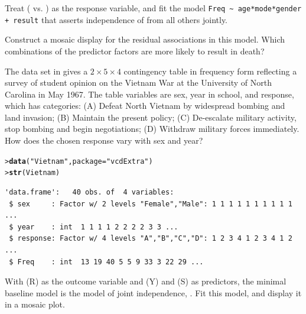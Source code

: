 \documentclass[10pt]{report}\usepackage[]{graphicx}\usepackage[]{color}
\makeatletter
\newcommand{\hlstr}[1]{\textcolor[rgb]{0.192,0.494,0.8}{#1}}%
\newcommand{\hlstd}[1]{\textcolor[rgb]{0.345,0.345,0.345}{#1}}%
\newcommand{\hlkwc}[1]{\textcolor[rgb]{0.333,0.667,0.333}{#1}}%
\newcommand{\hlkwd}[1]{\textcolor[rgb]{0.737,0.353,0.396}{\textbf{#1}}}%
\newenvironment{kframe}{%
 \def\at@end@of@kframe{}%
 \ifinner\ifhmode%
  \def\at@end@of@kframe{\end{minipage}}%
  \begin{minipage}{\columnwidth}%
 \fi\fi%
 \def\FrameCommand##1{\hskip\@totalleftmargin \hskip-\fboxsep
 \colorbox{shadecolor}{##1}\hskip-\fboxsep
     \hskip-\linewidth \hskip-\@totalleftmargin \hskip\columnwidth}%
 \MakeFramed {\advance\hsize-\width
   \@totalleftmargin\z@ \linewidth\hsize
   \@setminipage}}%
 {\par\unskip\endMakeFramed%
 \at@end@of@kframe}
\newenvironment{knitrout}{}{} %
\renewenvironment{knitrout}{\small\renewcommand{\baselinestretch}{.85}}{} %
\makeatother
\begin{document}
\begin{Exercises}
\begin{enumerate*}
      \item Treat  ( vs. ) as the response variable, and fit the model \newline
      \verb|Freq ~ age*mode*gender + result| that asserts independence of  from all others jointly.
      \begin{ans}
      \end{ans}
      
      \item Construct a mosaic display for the residual associations in this model.  Which combinations of the
      predictor factors are more likely to result in death?
      \begin{ans}
      \end{ans}
      
    \end{enumerate*}

  \exercise\label{lab:mosaic-vietnam}The data set  in  gives a $2 \times 5 \times 4$ contingency table in frequency form reflecting a survey of student opinion on the Vietnam War at the University of North Carolina in May 1967.  
  The table variables are sex, year in school, and response, which has categories: (A) Defeat North Vietnam by widespread bombing and land invasion; (B) Maintain the present policy; (C) De-escalate military activity, stop bombing and begin negotiations; (D) Withdraw military forces immediately.  How does the chosen response vary with sex and year?
\begin{knitrout}\footnotesize
{}\color{fgcolor}\begin{kframe}
\begin{alltt}
\hlstd{> }\hlkwd{data}\hlstd{(}\hlstr{"Vietnam"}\hlstd{,} \hlkwc{package} \hlstd{=} \hlstr{"vcdExtra"}\hlstd{)}
\hlstd{> }\hlkwd{str}\hlstd{(Vietnam)}
\end{alltt}
\begin{verbatim}
'data.frame':	40 obs. of  4 variables:
 $ sex     : Factor w/ 2 levels "Female","Male": 1 1 1 1 1 1 1 1 1 1 ...
 $ year    : int  1 1 1 1 2 2 2 2 3 3 ...
 $ response: Factor w/ 4 levels "A","B","C","D": 1 2 3 4 1 2 3 4 1 2 ...
 $ Freq    : int  13 19 40 5 5 9 33 3 22 29 ...
\end{verbatim}
\end{kframe}
\end{knitrout}
    \begin{enumerate*}
      \item With  (R) as the outcome variable and  (Y) and  (S) as predictors, the minimal
      baseline \loglin model is the model of joint independence, .  Fit this model, and display it in
      a mosaic plot.
      \begin{ans}
      \end{ans}
      

\end{enumerate*}
\end{Exercises}
\end{document}
